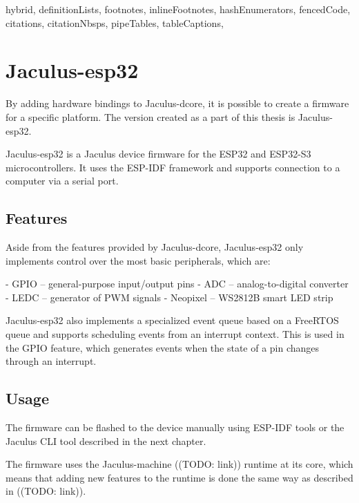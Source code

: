 \begin{markdown*}{%
  hybrid,
  definitionLists,
  footnotes,
  inlineFootnotes,
  hashEnumerators,
  fencedCode,
  citations,
  citationNbsps,
  pipeTables,
  tableCaptions,
}

\chapter{Jaculus-esp32}

By adding hardware bindings to Jaculus-dcore, it is possible to create a firmware for a specific platform. The version created as a part of this thesis is Jaculus-esp32.

Jaculus-esp32 is a Jaculus device firmware for the ESP32 and ESP32-S3 microcontrollers. It uses the ESP-IDF framework and supports connection to a computer via a serial port.

\section{Features}

Aside from the features provided by Jaculus-dcore, Jaculus-esp32 only implements control over the most basic peripherals, which are:

  - GPIO -- general-purpose input/output pins
  - ADC -- analog-to-digital converter
  - LEDC -- generator of PWM signals
  - Neopixel -- WS2812B smart LED strip

Jaculus-esp32 also implements a specialized event queue based on a FreeRTOS queue and supports scheduling events from an interrupt context. This is used in the GPIO feature, which generates events when the state of a pin changes through an interrupt.


\section{Usage}

The firmware can be flashed to the device manually using ESP-IDF tools or the Jaculus CLI tool described in the next chapter.

The firmware uses the Jaculus-machine ((TODO: link)) runtime at its core, which means that adding new features to the runtime is done the same way as described in ((TODO: link)).

\end{markdown*}
